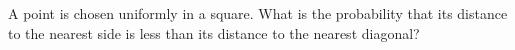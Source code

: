 A point is chosen uniformly in a square. What is the probability that its distance to the nearest side is less than its distance to the nearest diagonal?
